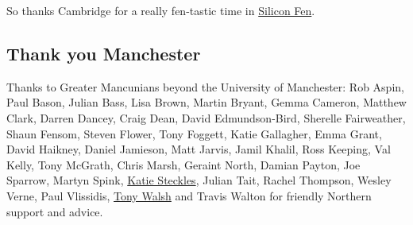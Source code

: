 \documentclass[
]{book}
\begin{document}
So thanks Cambridge for a really fen-tastic time in \href{https://en.wikipedia.org/wiki/Silicon_Fen}{Silicon Fen}. 🙏

\hypertarget{manchester}{%
\subsection{Thank you Manchester}\label{manchester}}

Thanks to Greater Mancunians beyond the University of Manchester: Rob Aspin, Paul Bason, Julian Bass, Lisa Brown, Martin Bryant, Gemma Cameron, Matthew Clark, Darren Dancey, Craig Dean, David Edmundson-Bird, Sherelle Fairweather, Shaun Fensom, Steven Flower, Tony Foggett, Katie Gallagher, Emma Grant, David Haikney, Daniel Jamieson, Matt Jarvis, Jamil Khalil, Ross Keeping, Val Kelly, Tony McGrath, Chris Marsh, Geraint North, Damian Payton, Joe Sparrow, Martyn Spink, \href{https://www.katiesteckles.co.uk/}{Katie Steckles}, Julian Tait, Rachel Thompson, Wesley Verne, Paul Vlissidis, \href{https://en.wikipedia.org/wiki/Tony_Walsh_(poet)}{Tony Walsh} and Travis Walton for friendly Northern support and advice.
\end{document}
